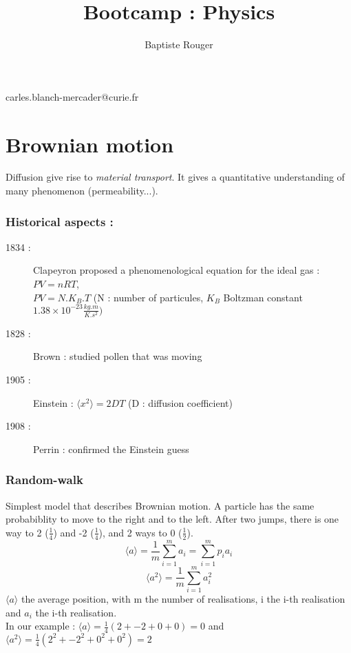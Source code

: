\documentclass[10pt,a4paper]{article}
\author{Baptiste Rouger}
\title{Bootcamp : Physics}
\begin{document}
\maketitle

\begin{flushright}
carles.blanch-mercader@curie.fr
\end{flushright}

\tableofcontents

\newpage

\part{Brownian motion}

Diffusion give rise to \emph{material transport}. It gives a quantitative understanding of many phenomenon (permeability...).

\section{Historical aspects :}
\begin{description}
    \item [1834 :] Clapeyron proposed a phenomenological equation for the ideal gas : $PV = n R T$, \\$PV = N.K_B .T$ (N : number of particules, $K_B$ Boltzman constant $1.38\times 10^{-23} \frac{kg . m}{K . s^2})$
    \item [1828 :] Brown : studied pollen that was moving
    \item [1905 :] Einstein : $\langle x^2\rangle = 2DT$ (D : diffusion coefficient)
    \item [1908 :] Perrin : confirmed the Einstein guess
\end{description}

\section{Random-walk}

Simplest model that describes Brownian motion. A particle has the same probabiblity to move to the right and to the left. After two jumps, there is one way to 2 ($\frac{1}{4}$) and -2 ($\frac{1}{4}$), and 2 ways to 0 ($\frac{1}{2}$).\\
\[ \langle a \rangle = \frac{1}{m} \sum ^m _{i=1} a_i =\sum ^m _{i=1} p_ia_i \]
\[ \langle a^2 \rangle = \frac{1}{m} \sum ^m _{i=1} a_i^2 \]
$\langle a \rangle$ the average position, with m the number of realisations, i the i-th realisation and $a_i$ the i-th realisation.\\
In our example : $\langle a \rangle = \frac{1}{4} (2 + {-2} + 0 + 0) = 0$ and $\langle a^2 \rangle = \frac{1}{4} (2^2 + {-2}^2 + 0^2 + 0^2) = 2$\\
\end{document}

